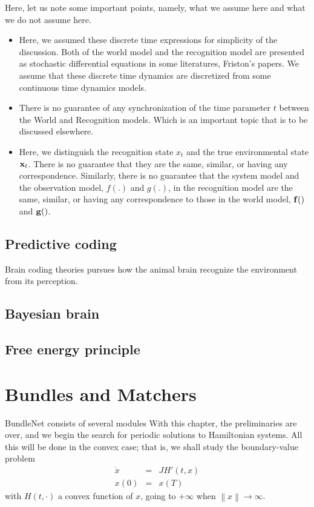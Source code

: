 \documentclass{article}
\begin{document}
Here, let us note some important points, namely, what we assume here and what we do not assume here.
\begin{itemize}
\item Here, we assumed these discrete time expressions for simplicity of the discussion.
Both of the world model and the recognition model are presented as stochastic differential equations in some literatures, \cite{**} Friston's papers.
We assume that these discrete time dynamics are discretized from some continuous time dynamics models. 
\item
There is no guarantee of any synchronization of the time parameter $t$ between the World and Recognition models. Which is an important topic that is to be discussed elsewhere.
\item
Here, we distinguish the recognition state $x_t$ and the true environmental state ${\bf x}_t$. There is no guarantee that they are the same, similar, or having any correspondence. Similarly, there is no guarantee that the system model and the observation model, $f(.)$ and $g(.)$, in the recognition model are the same, similar, or having any correspondence to those in the world model, ${\bf f}()$ and ${\bf g}()$. 
\end{itemize}

\subsection{Predictive coding}
Brain coding theories pursues how the animal brain recognize the environment from its perception.

\subsection{Bayesian brain}

\subsection{Free energy principle}

\section{Bundles and Matchers}
BundleNet consists of several modules
%
With this chapter, the preliminaries are over, and we begin the search
for periodic solutions to Hamiltonian systems. All this will be done in
the convex case; that is, we shall study the boundary-value problem
\begin{eqnarray*}
  \dot{x}&=&JH' (t,x)\\
  x(0) &=& x(T)
\end{eqnarray*}
with $H(t,\cdot)$ a convex function of $x$, going to $+\infty$ when
$\left\|x\right\| \to \infty$.
\end{document}

